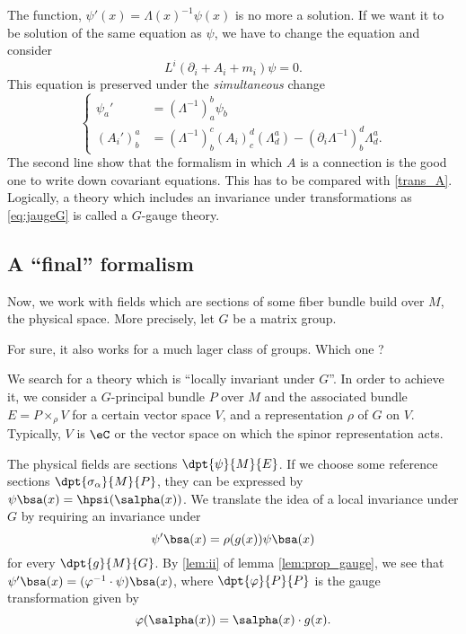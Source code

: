 The function, $\psi'(x)=\Lambda(x)^{-1}\psi(x)$ is no more a solution. If we want it to be solution of the same equation as $\psi$, we have to change the equation and consider
\[
   L^i(\partial_i+A_i+m_i)\psi=0.
\]
This equation is preserved under the \emph{simultaneous} change
\begin{equation}\label{eq:jaugeG}
    \left\{\begin{aligned}
	   \psi_a'&=(\Lambda^{-1})^b_a\psi_b\\
           (A_i')^a_b&=(\Lambda^{-1})^c_b (A_i)^d_c(\Lambda^a_d)-(\partial_i\Lambda^{-1})^d_b\Lambda^a_d.
          \end{aligned}\right.
\end{equation}
The second line show that the formalism in which $A$ is a connection is the good one to write down covariant equations. This has to be compared with \eqref{trans_A}. Logically, a theory which includes an invariance under transformations as \eqref{eq:jaugeG} is called a $G$-gauge theory.

\subsection{A ``final'' formalism}

Now, we work with fields which are sections of some fiber bundle build over $M$, the physical space. More precisely, let $G$ be a matrix group. 

\begin{probleme}
	For sure, it also works for a much lager class of groups. Which one ?
\end{probleme}


We search for a theory which is ``locally invariant under $G$''. In order to achieve it, we consider a $G$-principal bundle $P$ over $M$ and the associated bundle $E=P\times_{\rho}V$ for a certain vector space $V$, and a representation $\rho$ of $G$ on $V$. Typically, $V$ is $\eC$ or the vector space on which the spinor representation acts.

The physical fields are sections $\dpt{\psi}{M}{E}$. If we choose some reference sections $\dpt{\sigma_{\alpha}}{M}{P}$, they can be expressed by $\psi\bsa(x)=\hpsi(\salpha(x))$. We translate the idea of a local invariance under $G$ by requiring an invariance under
\[
     \psi'\bsa(x)=\rho(g(x))\psi\bsa(x)
\]
for every $\dpt{g}{M}{G}$. By \ref{lem:ii} of lemma \ref{lem:prop_gauge}, we see that $\psi'\bsa(x)=(\varphi^{-1}\cdot\psi)\bsa(x)$, where $\dpt{\varphi}{P}{P}$ is the gauge transformation given by
\[
   \varphi(\salpha(x))=\salpha(x)\cdot g(x).
\]


